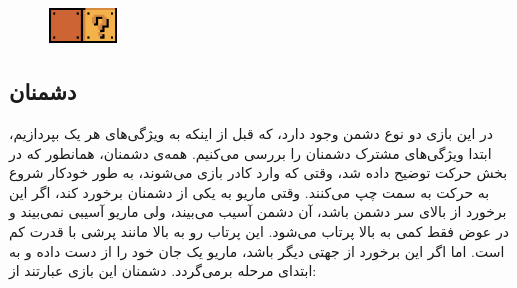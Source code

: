 \documentclass{utap}
\begin{document}
\begin{itemize}
\begin{itemize}
\begin{minipage}{.7\textwidth}
\end{minipage}
\begin{minipage}{.15\textwidth}
\begin{figure}[H]
	\begin{center}
		\includegraphics[width=1.8cm]{magicBricks}
	\end{center}
\end{figure}
\end{minipage}

		\end{itemize}
	\end{itemize}


	\subsection{دشمنان}
در این بازی دو نوع دشمن وجود دارد، که قبل از اینکه به ویژگی‌های هر یک بپردازیم، ابتدا ویژگی‌های مشترک دشمنان را بررسی می‌کنیم.
همه‌ی دشمنان، همانطور که در بخش حرکت توضیح داده شد، وقتی که وارد کادر بازی می‌شوند، به طور خودکار شروع به حرکت به سمت چپ می‌کنند.
وقتی ماریو به یکی از دشمنان برخورد کند، اگر این برخورد از بالای سر دشمن باشد، آن دشمن آسیب می‌بیند، ولی ماریو آسیبی نمی‌بیند و در عوض فقط کمی به بالا پرتاب می‌شود. این پرتاب رو به بالا مانند پرشی با قدرت کم است. اما اگر این برخورد از جهتی دیگر باشد، ماریو یک جان خود را از دست داده و به ابتدای مرحله برمی‌گردد. دشمنان این بازی عبارتند از:
\end{document}
